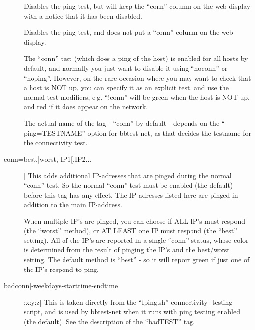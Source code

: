  \begin{description}
\item[] Disables the ping-test, but will keep the ``conn'' column on the web display with a notice that it has been disabled. 

 

\item[] Disables the ping-test, and does not put a ``conn'' column on the web display. 

 

\item[] The ``conn'' test (which does a ping of the host) is
  enabled for all hosts by default, and normally you just want to
  disable it using ``noconn'' or ``noping''. However, on the rare
  occasion where you may want to check that a host is NOT up, you can
  specify it as an explicit test, and use the normal test modifiers,
  e.g. ``!conn'' will be green when the host is NOT up, and red if it
  does appear on the network. 


  The actual name of the tag - ``conn'' by default - depends on the ``--ping=TESTNAME'' option for bbtest-net, as that decides the testname for the connectivity test. 


 

\item [conn=best,|worst, IP1[,IP2...]] This adds additional
  IP-adresses that are pinged during the normal ``conn'' test. So the
  normal ``conn'' test must be enabled (the default) before this tag
  has any effect. The IP-adresses listed here are pinged in addition
  to the main IP-address. 


  When multiple IP's are pinged, you can choose if ALL IP's must
  respond (the ``worst'' method), or AT LEAST one IP must respond (the
  ``best'' setting). All of the IP's are reported in a single ``conn''
  status, whose color is determined from the result of pinging the
  IP's and the best/worst setting. The default method is ``best'' - so
  it will report green if just one of the IP's respond to ping. 



 

\item[badconn[-weekdays-starttime-endtime]:x:y:z] This is taken
  directly from the ``fping.sh'' connectivity- testing script, and is
  used by bbtest-net when it runs with ping testing enabled (the
  default). See the description of the ``badTEST'' tag. 



\end{description}
